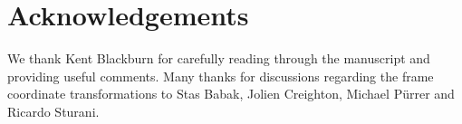 \documentclass[aps,prd,amssymb,amsmath,amsfonts,superscriptaddress,
floatfix ,preprintnumbers,altaffilletter]{revtex4}
\begin{document}
\section*{Acknowledgements}
We thank Kent Blackburn for carefully reading through the manuscript and providing useful comments.
Many thanks for discussions regarding the frame coordinate transformations to Stas Babak, Jolien Creighton, Michael P\"urrer and Ricardo Sturani.




\end{document}
